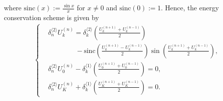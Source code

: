 \documentclass[dvipdfmx-if-dvi,autodetect-engine,ja=standard]{amsart}
\numberwithin{equation}{section} %
\begin{document}
where
$\mathrm{sinc}(x) := \frac{\sin x}{x}$
for $x\neq 0$ and
$\mathrm{sinc}(0) := 1$.
Hence, the energy conservation scheme is given by
\begin{align}\label{eq:scheme:sineGordon:sec3}
    \left\{
    \begin{alignedat}{1}
    &\delta_n^{\langle 2\rangle} U_k^{(n)}
    = \delta_k^{\langle 2 \rangle}
    \left(
        \frac{U_k^{(n+1)}+U_k^{(n-1)}}{2}
    \right) \\
    &\qquad \qquad 
    - \mathrm{sinc} \left( \frac{U_k^{(n+1)}-U_k^{(n-1)}}{2} \right)
    \sin \left( \frac{U_k^{(n+1)}+U_k^{(n-1)}}{2} \right),\\
    &\delta_n^{\langle 2\rangle} U_0^{(n)}
        - \delta_k^{\langle 1 \rangle}
        \left(
            \frac{U_0^{(n+1)}+U_0^{(n-1)}}{2}
        \right)
        = 0,\\
    &\delta_n^{\langle 2\rangle} U_K^{(n)}
       + \delta_k^{\langle 1 \rangle}
        \left(
            \frac{U_K^{(n+1)}+U_K^{(n-1)}}{2}
        \right)
        = 0.
    \end{alignedat}
    \right.
\end{align}






\end{document}
